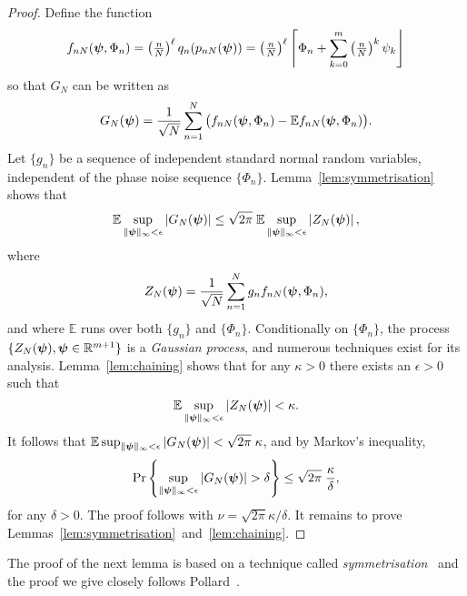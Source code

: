 \documentclass[aap]{imsart}
\newcommand{\reals}{{\mathbb R}}
\newcommand{\prob}{\operatorname{Pr}}
\newcommand{\expect}{{\mathbb E}}
\newcommand{\abs}[1]{\left\vert #1 \right\vert}
\newcommand{\round}[1]{{\left\lceil #1 \right\rfloor}}
\newcommand{\cubr}[1]{{\left\{ #1 \right\}}}
\begin{document}
\begin{proof}
Define the function 
\begin{align*}
f_{nN}(\psibf, \Phi_n) = \left( \tfrac{n}{N}\right)^\ell q_n(p_{nN}(\psibf)) = \left( \tfrac{n}{N}\right)^\ell \round{\Phi_n + \sum_{k=0}^m\left( \tfrac{n}{N}\right)^k\psi_k}
\end{align*}
so that $G_N$ can be written as
\[
G_N(\psibf) = \frac{1}{\sqrt{N}} \sum_{n=1}^{N} \big( f_{nN}(\psibf, \Phi_n) - \expect f_{nN}(\psibf, \Phi_n) \big).
\]
Let $\{g_n\}$ be a sequence of independent standard normal random variables, independent of the phase noise sequence $\{\Phi_n\}$.  Lemma~\ref{lem:symmetrisation} shows that
\[
\expect \sup_{\|\psibf\|_{\infty} < \epsilon} \abs{ G_N(\psibf)} \leq \sqrt{2\pi} \; \expect \sup_{\|\psibf\|_{\infty} < \epsilon}  \abs{ Z_N(\psibf) },
\]
where 
\begin{equation}\label{eq:ZpsiCondGaussProc}
Z_N(\psibf) = \frac{1}{\sqrt{N}} \sum_{n=1}^{N} g_n f_{nN}(\psibf, \Phi_n),
\end{equation}
and where $\expect$ runs over both $\{g_n\}$ and $\{\Phi_n\}$.  Conditionally on $\{\Phi_n\}$, the process $\{Z_N(\psibf), \psibf \in \reals^{m+1} \}$ is a \emph{Gaussian process}, and numerous techniques exist for its analysis.  Lemma~\ref{lem:chaining} shows that for any $\kappa > 0$ there exists an $\epsilon > 0$ such that
\[
\expect \sup_{\|\psibf\|_{\infty} < \epsilon} \abs{ Z_N(\psibf) } < \kappa.
\]
It follows that $\expect \sup_{\|\psibf\|_{\infty} < \epsilon} \abs{ G_N(\psibf)}  <  \sqrt{2\pi} \; \kappa$, and by Markov's inequality,
\[
\prob \cubr{  \sup_{\|\psibf\|_{\infty} < \epsilon} \abs{ G_N(\psibf)} > \delta } \leq  \sqrt{2\pi} \; \frac{\kappa}{\delta},
\]
for any $\delta > 0$.  The proof follows with $\nu =  \sqrt{2\pi} \kappa/\delta$.  It remains to prove Lemmas~\ref{lem:symmetrisation}~and~\ref{lem:chaining}.

\end{proof}

The proof of the next lemma is based on a technique called \emph{symmetrisation}~\cite{Gine_Zinn_symmetrisation_1984} and the proof we give closely follows Pollard~\cite[Sec.~4]{Pollard_asymp_empi_proc_1989}.
\end{document}
